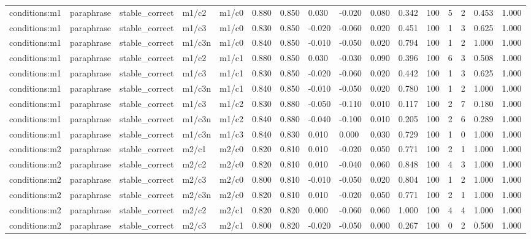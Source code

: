 \begin{tabular}{llllllllllllllll}
conditions:m1 & paraphrase & stable\_correct & m1/c2 & m1/c0 & 0.880 & 0.850 & 0.030 & -0.020 & 0.080 & 0.342 & 100 & 5 & 2 & 0.453 & 1.000 \\
conditions:m1 & paraphrase & stable\_correct & m1/c3 & m1/c0 & 0.830 & 0.850 & -0.020 & -0.060 & 0.020 & 0.451 & 100 & 1 & 3 & 0.625 & 1.000 \\
conditions:m1 & paraphrase & stable\_correct & m1/c3n & m1/c0 & 0.840 & 0.850 & -0.010 & -0.050 & 0.020 & 0.794 & 100 & 1 & 2 & 1.000 & 1.000 \\
conditions:m1 & paraphrase & stable\_correct & m1/c2 & m1/c1 & 0.880 & 0.850 & 0.030 & -0.030 & 0.090 & 0.396 & 100 & 6 & 3 & 0.508 & 1.000 \\
conditions:m1 & paraphrase & stable\_correct & m1/c3 & m1/c1 & 0.830 & 0.850 & -0.020 & -0.060 & 0.020 & 0.442 & 100 & 1 & 3 & 0.625 & 1.000 \\
conditions:m1 & paraphrase & stable\_correct & m1/c3n & m1/c1 & 0.840 & 0.850 & -0.010 & -0.050 & 0.020 & 0.780 & 100 & 1 & 2 & 1.000 & 1.000 \\
conditions:m1 & paraphrase & stable\_correct & m1/c3 & m1/c2 & 0.830 & 0.880 & -0.050 & -0.110 & 0.010 & 0.117 & 100 & 2 & 7 & 0.180 & 1.000 \\
conditions:m1 & paraphrase & stable\_correct & m1/c3n & m1/c2 & 0.840 & 0.880 & -0.040 & -0.100 & 0.010 & 0.205 & 100 & 2 & 6 & 0.289 & 1.000 \\
conditions:m1 & paraphrase & stable\_correct & m1/c3n & m1/c3 & 0.840 & 0.830 & 0.010 & 0.000 & 0.030 & 0.729 & 100 & 1 & 0 & 1.000 & 1.000 \\
conditions:m2 & paraphrase & stable\_correct & m2/c1 & m2/c0 & 0.820 & 0.810 & 0.010 & -0.020 & 0.050 & 0.771 & 100 & 2 & 1 & 1.000 & 1.000 \\
conditions:m2 & paraphrase & stable\_correct & m2/c2 & m2/c0 & 0.820 & 0.810 & 0.010 & -0.040 & 0.060 & 0.848 & 100 & 4 & 3 & 1.000 & 1.000 \\
conditions:m2 & paraphrase & stable\_correct & m2/c3 & m2/c0 & 0.800 & 0.810 & -0.010 & -0.050 & 0.020 & 0.804 & 100 & 1 & 2 & 1.000 & 1.000 \\
conditions:m2 & paraphrase & stable\_correct & m2/c3n & m2/c0 & 0.820 & 0.810 & 0.010 & -0.020 & 0.050 & 0.771 & 100 & 2 & 1 & 1.000 & 1.000 \\
conditions:m2 & paraphrase & stable\_correct & m2/c2 & m2/c1 & 0.820 & 0.820 & 0.000 & -0.060 & 0.060 & 1.000 & 100 & 4 & 4 & 1.000 & 1.000 \\
conditions:m2 & paraphrase & stable\_correct & m2/c3 & m2/c1 & 0.800 & 0.820 & -0.020 & -0.050 & 0.000 & 0.267 & 100 & 0 & 2 & 0.500 & 1.000 \\

\end{tabular}
